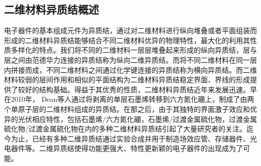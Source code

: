 \subsection{二维材料异质结概述}
电子器件的基本组成元件为异质结，通过对二维材料进行纵向堆叠或者平面组装而形成的二维材料异质结能够结合不同二维材料优异的物理特性，最大化的利用其性质多样化的特点。我们将不同的二维材料一层层堆叠起来形成的纵向异质结，层与层之间由范德华力连接的异质结称为纵向二维异质结。而将不同二维材料在同一层内拼接而成，不同二维材料之间通过化学键连接的异质结称为横向异质结。而二维材料较弱的层间作用和相似的平面结构为二维材料异质结稳定界面、界线的形成提供了较好的结构基础。得益于其优秀的性质，二维材料异质结近年来发展迅速。早在2010年， Dean等人通过将剥离的单层石墨烯转移到六方氮化硼上，制成了由两个单原子层的二维材料组成的异质结。在那之后，由于其独特的界面激子效应和优异的光伏相应特性，包括石墨烯/六方氮化硼，石墨烯/过渡金属硫化物，过渡金属硫化物/过渡金属硫化物在内的多种二维材料异质结引起了大量研究者的关注。迄今为止，已经有多种二维异质结通过实验合成并用于制造场效应管、存储器件、光电器件等。二维异质结使得功能更强大、特性更新颖的电子器件的出现成为了可能。

